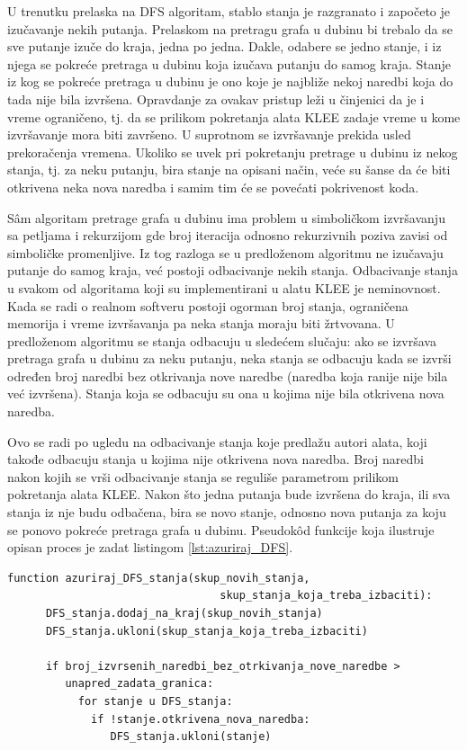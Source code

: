 \documentclass[12pt,oneside]{memoir}
\begin{document}
U trenutku prelaska na DFS algoritam, stablo stanja je razgranato i započeto je izučavanje nekih putanja. Prelaskom na pretragu grafa u dubinu bi trebalo da se sve putanje izuče do kraja, jedna po jedna. Dakle, odabere se jedno stanje, i iz njega se pokreće pretraga u dubinu koja izučava putanju do samog kraja. Stanje iz kog se pokreće pretraga u dubinu je ono koje je najbliže nekoj naredbi koja do tada nije bila izvršena. Opravdanje za ovakav pristup leži u činjenici da je i vreme ograničeno, tj. da se prilikom pokretanja alata KLEE zadaje vreme u kome izvršavanje mora biti završeno. U suprotnom se izvršavanje prekida usled prekoračenja vremena. Ukoliko se uvek pri pokretanju pretrage u dubinu iz nekog stanja, tj. za neku putanju, bira stanje na opisani način, veće su šanse da će biti otkrivena neka nova naredba i samim tim će se povećati pokrivenost koda. 

S\^am algoritam pretrage grafa u dubinu ima problem u simboličkom izvršavanju sa petljama i rekurzijom gde broj iteracija odnosno rekurzivnih poziva zavisi od simboličke promenljive. Iz tog razloga se u predloženom algoritmu ne izučavaju putanje do samog kraja, već postoji odbacivanje nekih stanja. Odbacivanje stanja u svakom od algoritama koji su implementirani u alatu KLEE je neminovnost. Kada se radi o realnom softveru postoji ogorman broj stanja, ograničena memorija i vreme izvršavanja pa neka stanja moraju biti žrtvovana. U predloženom algoritmu se stanja odbacuju u sledećem slučaju: ako se izvršava pretraga grafa u dubinu za neku putanju, neka stanja se odbacuju kada se izvrši određen broj naredbi bez otkrivanja nove naredbe (naredba koja ranije nije bila već izvršena). Stanja koja se odbacuju su ona u kojima nije bila otkrivena nova naredba.


Ovo se radi po ugledu na odbacivanje stanja koje predlažu autori alata, koji takođe odbacuju stanja u kojima nije otkrivena nova naredba. Broj naredbi nakon kojih se vrši odbacivanje stanja se reguliše parametrom prilikom pokretanja alata KLEE. Nakon što jedna putanja bude izvršena do kraja, ili sva stanja iz nje budu odbačena, bira se novo stanje, odnosno nova putanja za koju se ponovo pokreće pretraga grafa u dubinu. Pseudok\^od funkcije koja ilustruje opisan proces je zadat listingom \ref{lst:azuriraj_DFS}.

    \begin{lstlisting}[caption={Pseudok\^od funkcije za ažuriranje DFS stanja},captionpos=b,label={lst:azuriraj_DFS}]
    function azuriraj_DFS_stanja(skup_novih_stanja, 
                                 skup_stanja_koja_treba_izbaciti):
      DFS_stanja.dodaj_na_kraj(skup_novih_stanja)
      DFS_stanja.ukloni(skup_stanja_koja_treba_izbaciti)        
            
      if broj_izvrsenih_naredbi_bez_otrkivanja_nove_naredbe > 
         unapred_zadata_granica:
           for stanje u DFS_stanja:
             if !stanje.otkrivena_nova_naredba:
                DFS_stanja.ukloni(stanje)
    \end{lstlisting}
\end{document}
